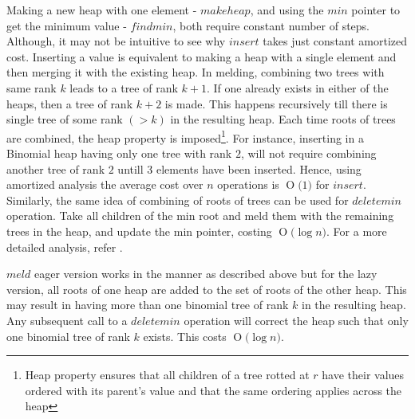 \documentclass{llncs}
\newcommand{\BigO}[1]{\ensuremath{\operatorname{O}\bigl(#1\bigr)}}
\begin{document}
Making a new heap with one element - $makeheap$, and using the $min$ pointer to get the minimum value - $findmin$, both require constant number of steps. Although, it may not be intuitive to see why $insert$ takes just constant amortized cost. Inserting a value is equivalent to making a heap with a single element and then merging it with the existing heap. In melding, combining two trees with same rank $k$ leads to a tree of rank $k+1$. If one already exists in either of the heaps, then a tree of rank $k+2$ is made. This happens recursively till there is single tree of some rank $(>k)$ in the resulting heap. Each time roots of trees are combined, the heap property is imposed\footnote{Heap property ensures that all children of a tree rotted at $r$ have their values ordered with its parent's value and that the same ordering applies across the heap}. For instance, inserting in a Binomial heap having only one tree with rank $2$, will not require combining another tree of rank $2$ untill $3$ elements have been inserted. Hence, using amortized analysis the  average cost over $n$ operations is \BigO{1} for $insert$.  Similarly, the same idea of combining of roots of trees can be used for $deletemin$ operation. Take all children of the min root and meld them with the remaining trees in the heap, and update the min pointer, costing \BigO{\log n}. For a more detailed analysis, refer \cite{kozen1992design}.

$meld$ eager version works in the manner as described above but for the lazy version, all roots of one heap are added to the set of roots of the other heap. This may result in having more than one binomial tree of rank $k$ in the resulting heap. Any subsequent call to a $deletemin$ operation will correct the heap such that only one binomial tree of rank $k$ exists. This costs \BigO{\log n}.
\end{document}
